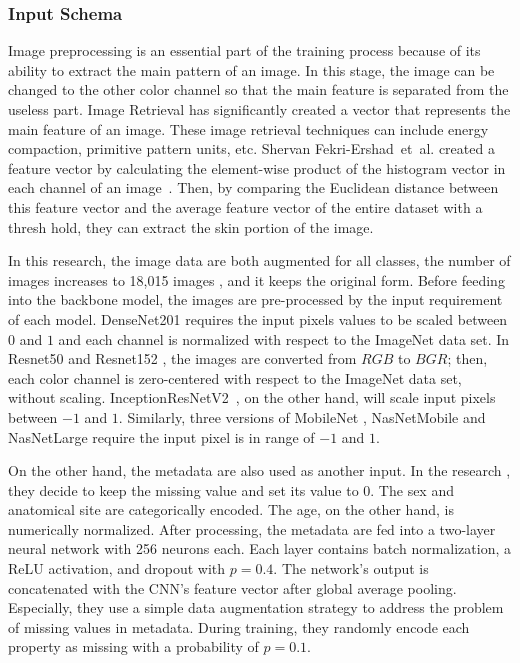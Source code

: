 \documentclass[sensors,article,accept,pdftex,moreauthors]{Definitions/mdpi}
\begin{document}
	\subsubsection{Input Schema}
	{Image preprocessing is an essential part of the training process because of its ability to extract the main pattern of an image. In this stage, the image can be changed to the other color channel so that the main feature is separated from the useless part. Image Retrieval  has significantly created a vector that represents the main feature of an image. These image retrieval techniques can include energy compaction, primitive pattern units, etc. Shervan Fekri-Ershad~et~al. created a feature vector by calculating the element-wise product of the histogram vector in each channel of an image~\mbox{\cite{2012.4305}}}. Then, by comparing the Euclidean distance between this feature vector and the average feature vector of the entire dataset with a thresh hold, they can extract the skin portion of the image.
	
	In this research, the image data are both augmented for all classes, the number of images increases to 18,015 images , and it keeps the original form. Before feeding into the backbone model, the images are pre-processed by the input requirement of each model. DenseNet201 \cite{06993} requires the input pixels values to be scaled between $0$ and $1$ and each channel is normalized with respect to the ImageNet data set. In Resnet50 and Resnet152 \cite{03385,05027}, the images are converted from $RGB$ to $BGR$; then, each color channel is zero-centered with respect to the ImageNet data set, without scaling. InceptionResNetV2~\cite{11946}, on the other hand, will scale input pixels between $-1$ and $1$. Similarly, three versions of MobileNet \cite{04861,04381,02244}, NasNetMobile and NasNetLarge \cite{07012} require the input pixel is in range of $-1$ and $1$. 
	
	On the other hand, the metadata are also used as another input. In the research \cite{03910}, they decide to keep the missing value and set its value to $0$. The sex and anatomical site are categorically encoded. The age, on the other hand, is numerically normalized. After processing, the metadata are fed into a two-layer neural network with 256 neurons each. Each layer contains batch normalization, a ReLU \cite{08375} activation, and dropout with $p = 0.4$. The network’s output is concatenated with the CNN’s feature vector after global average pooling. Especially, they use a simple data augmentation strategy to address the problem of missing values in metadata. During training, they randomly encode each property as missing with a probability of $p = 0.1$. 
	
\end{document}
